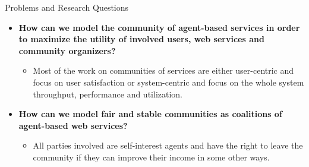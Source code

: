 \documentclass{beamer}
\begin{document}
\begin{frame}{Problems and Research Questions}

\begin{itemize}
    \item \textbf{How can we model the
        community of agent-based services in order to maximize the utility
        of involved users, web services and community organizers?}
        \begin{itemize}
            \item Most of the work on communities of
            services are either user-centric and focus on user satisfaction
            or system-centric and focus on the whole system throughput, performance and utilization.
        \end{itemize}


    \item \textbf{How can we model fair and stable communities as coalitions
        of agent-based web services?}
        \begin{itemize}
            \item All parties involved are self-interest agents and have the right to leave the community if they can improve their income in some other ways.
        \end{itemize}

\end{itemize}

\end{frame}
\end{document}
